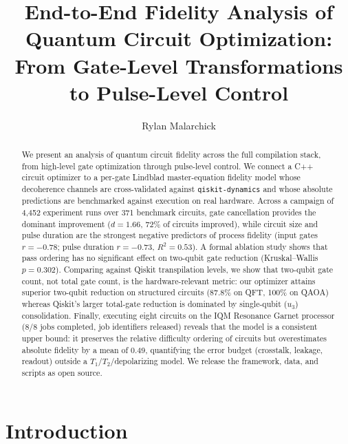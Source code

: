 \documentclass[sigconf,nonacm]{acmart}
\title{End-to-End Fidelity Analysis of Quantum Circuit Optimization: From Gate-Level Transformations to Pulse-Level Control}
\author{Rylan Malarchick}
\affiliation{%
  \institution{Embry-Riddle Aeronautical University}
  \department{Department of Engineering Physics}
  \city{Daytona Beach}
  \state{FL}
  \country{USA}
}
\begin{document}

\begin{abstract}
We present an analysis of quantum circuit fidelity across the full compilation stack, from high-level gate optimization through pulse-level control. We connect a C++ circuit optimizer to a per-gate Lindblad master-equation fidelity model whose decoherence channels are cross-validated against \texttt{qiskit-dynamics} and whose absolute predictions are benchmarked against execution on real hardware. Across a campaign of 4{,}452 experiment runs over 371 benchmark circuits, gate cancellation provides the dominant improvement ($d = 1.66$, 72\% of circuits improved), while circuit size and pulse duration are the strongest negative predictors of process fidelity (input gates $r = -0.78$; pulse duration $r = -0.73$, $R^2 = 0.53$). A formal ablation study shows that pass ordering has no significant effect on two-qubit gate reduction (Kruskal--Wallis $p = 0.302$). Comparing against Qiskit transpilation levels, we show that two-qubit gate count, not total gate count, is the hardware-relevant metric: our optimizer attains superior two-qubit reduction on structured circuits (87.8\% on QFT, 100\% on QAOA) whereas Qiskit's larger total-gate reduction is dominated by single-qubit ($u_3$) consolidation. Finally, executing eight circuits on the IQM Resonance Garnet processor (8/8 jobs completed, job identifiers released) reveals that the model is a consistent upper bound: it preserves the relative difficulty ordering of circuits but overestimates absolute fidelity by a mean of 0.49, quantifying the error budget (crosstalk, leakage, readout) outside a $T_1$/$T_2$/depolarizing model. We release the framework, data, and scripts as open source.
\end{abstract}

\maketitle

\section{Introduction}
\label{sec:introduction}
\end{document}
